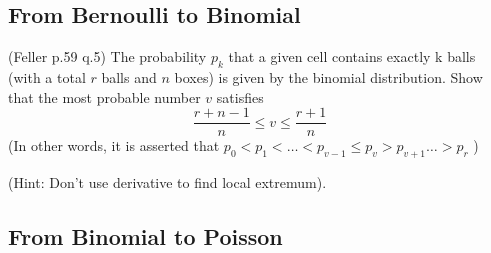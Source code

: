 \subsection{From Bernoulli to Binomial}
\begin{exercise}
    (Feller p.59 q.5) The probability \(p_{k}\) that a given  cell contains exactly k balls (with a total \(r\) balls and \(n\) boxes) is given by the binomial distribution. 
    Show that the most probable number \(v\) satisfies 
    \[
        \frac{r+n-1}{n} \leq  v \leq \frac{r+1}{n}
    \]
    (In other words, it is asserted that \(p_0 < p_1 < \dots < p_{v-1} \leq p_{v} >  p_{v+1} \dots > p_r \) )
\end{exercise}
(Hint: Don't use derivative to find local extremum).

\subsection{From Binomial to Poisson}




